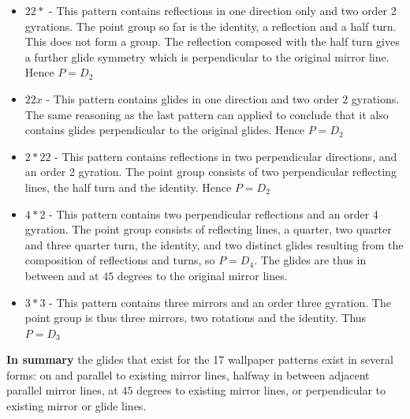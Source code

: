 \documentclass{article}
\begin{document}
\begin{itemize}
\item$22*$ - This pattern contains reflections in one direction only and two order 2 gyrations. The point group so far is the identity, a reflection and a half turn. This does not form a group. The reflection composed with the half turn gives a further glide symmetry which is perpendicular to the original mirror line. Hence $P = D_2$
\item$22x$ - This pattern contains glides in one direction and two order 2 gyrations. The same reasoning as the last pattern can applied to conclude that it also contains glides perpendicular to the original glides. Hence $P = D_2$
\item$2*22$ - This pattern contains reflections in two perpendicular directions, and an order 2 gyration. The point group consists of two perpendicular reflecting lines, the half turn and the identity. Hence $P = D_2$
\item$4*2$ - This pattern contains two perpendicular reflections and an order 4 gyration. The point group consists of reflecting lines, a quarter, two quarter and three quarter turn, the identity, and two distinct glides resulting from the composition of reflections and turns, so $P = D_4$. The glides are thus in between and at $45$ degrees to the original mirror lines.
\item$3*3$ - This pattern contains three mirrors and an order three gyration. The point group is thus three mirrors, two rotations and the identity. Thus $P = D_3$
\end{itemize}

\textbf{In summary} the glides that exist for the 17 wallpaper patterns exist in several forms: on and parallel to existing mirror lines, halfway in between adjacent parallel mirror lines, at $45$ degrees to existing mirror lines, or perpendicular to existing mirror or glide lines.
\end{document}

